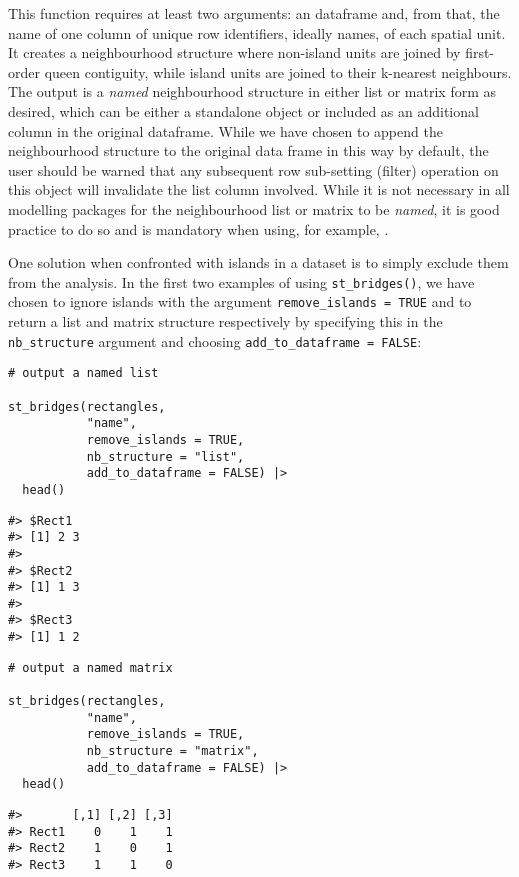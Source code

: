 This function requires at least two arguments: an  dataframe and, from that, the name of one column of unique row identifiers, ideally names, of each spatial unit. It creates a neighbourhood structure where non-island units are joined by first-order queen contiguity, while island units are joined to their k-nearest neighbours. The output is a \emph{named} neighbourhood structure in either list or matrix form as desired, which can be either a standalone object or included as an additional column in the original  dataframe. While we have chosen to append the neighbourhood structure to the original data frame in this way by default, the user should be warned that any subsequent row sub-setting (filter) operation on this object will invalidate the list column involved. While it is not necessary in all modelling packages for the neighbourhood list or matrix to be \emph{named}, it is good practice to do so and is mandatory when using, for example, .

One solution when confronted with islands in a dataset is to simply exclude them from the analysis. In the first two examples of using \texttt{st\_bridges()}, we have chosen to ignore islands with the argument \texttt{remove\_islands\ =\ TRUE} and to return a list and matrix structure respectively by specifying this in the \texttt{nb\_structure} argument and choosing \texttt{add\_to\_dataframe\ =\ FALSE}:

\begin{verbatim}
# output a named list

st_bridges(rectangles, 
           "name", 
           remove_islands = TRUE, 
           nb_structure = "list", 
           add_to_dataframe = FALSE) |>
  head()
\end{verbatim}

\begin{verbatim}
#> $Rect1
#> [1] 2 3
#> 
#> $Rect2
#> [1] 1 3
#> 
#> $Rect3
#> [1] 1 2
\end{verbatim}

\begin{verbatim}
# output a named matrix

st_bridges(rectangles, 
           "name", 
           remove_islands = TRUE, 
           nb_structure = "matrix", 
           add_to_dataframe = FALSE) |> 
  head()
\end{verbatim}

\begin{verbatim}
#>       [,1] [,2] [,3]
#> Rect1    0    1    1
#> Rect2    1    0    1
#> Rect3    1    1    0
\end{verbatim}

